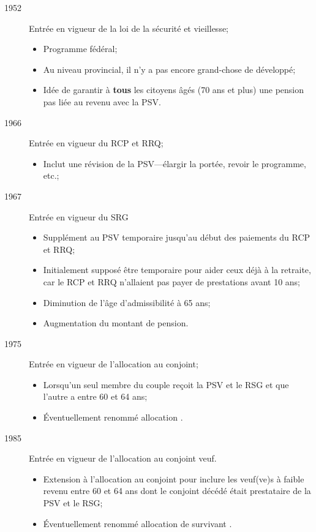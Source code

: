 \documentclass[10pt, french]{article}
\begin{document}
\begin{multicols*}{3}
\begin{rappel_enhanced}[Historique]
\begin{description}
	\item[1952]	Entrée en vigueur de la loi de la sécurité et vieillesse;
		\begin{itemize}[leftmargin = *]
		\item	Programme fédéral;
		\item	Au niveau provincial, il n'y a pas encore grand-chose de développé;
		\item	Idée de garantir à \textbf{tous}	les citoyens âgés (70 ans et plus) une pension pas liée au revenu avec la PSV.
		\end{itemize}
	\item[1966]	Entrée en vigueur du RCP et RRQ;
		\begin{itemize}[leftmargin = *]
		\item	Inclut une révision de la PSV---élargir la portée, revoir le programme, etc.;
		\end{itemize}
	\item[1967]	Entrée en vigueur du SRG
		\begin{itemize}[leftmargin = *]
		\item	Supplément au PSV temporaire jusqu'au début des paiements du RCP et RRQ;
		\item	Initialement supposé être temporaire pour aider ceux déjà à la retraite, car le RCP et RRQ n'allaient pas payer de prestations avant 10 ans;
		\item	Diminution de l'âge d'admissibilité à 65 ans;
		\item	Augmentation du montant de pension.
		\end{itemize}
	\item[1975]	Entrée en vigueur de l'allocation au conjoint;
		\begin{itemize}[leftmargin = *]
		\item	Lorsqu'un seul membre du couple reçoit la PSV et le RSG et que l'autre a entre 60 et 64 ans;
		\item	Éventuellement renommé \og allocation \fg{}.
		\end{itemize}
	\item[1985]	Entrée en vigueur de l'allocation au conjoint veuf.
		\begin{itemize}[leftmargin = *]
		\item	Extension à l'allocation au conjoint pour inclure les veuf(ve)s à faible revenu entre 60 et 64 ans dont le conjoint décédé était prestataire de la PSV et le RSG;
		\item	Éventuellement renommé \og allocation de survivant \fg{}.
		\end{itemize}
\end{description}
\end{rappel_enhanced}


\end{multicols*}
\end{document}
